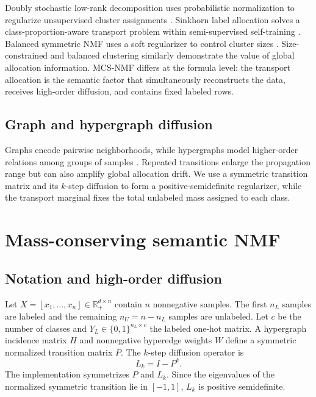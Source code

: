 \documentclass[times, review, 10pt]{elsarticle}
\newcommand{\R}{\mathbb{R}}
\begin{document}
Doubly stochastic low-rank decomposition uses probabilistic normalization to regularize unsupervised cluster assignments \cite{Yang2016Doubly}. Sinkhorn label allocation solves a class-proportion-aware transport problem within semi-supervised self-training \cite{Tai2021Sinkhorn}. Balanced symmetric NMF uses a soft regularizer to control cluster sizes \cite{Wang2026BSNMF}. Size-constrained and balanced clustering similarly demonstrate the value of global allocation information. MCS-NMF differs at the formula level: the transport allocation is the semantic factor that simultaneously reconstructs the data, receives high-order diffusion, and contains fixed labeled rows.

\subsection{Graph and hypergraph diffusion}

Graphs encode pairwise neighborhoods, while hypergraphs model higher-order relations among groups of samples \cite{Qiao2018GraphReview,Gao2022HypergraphReview,Song2023GSSLReview}. Repeated transitions enlarge the propagation range but can also amplify global allocation drift. We use a symmetric transition matrix and its $k$-step diffusion to form a positive-semidefinite regularizer, while the transport marginal fixes the total unlabeled mass assigned to each class.

\section{Mass-conserving semantic NMF}

\subsection{Notation and high-order diffusion}

Let $X=[x_1,\ldots,x_n]\in\R_+^{d\times n}$ contain $n$ nonnegative samples. The first $n_L$ samples are labeled and the remaining $n_U=n-n_L$ samples are unlabeled. Let $c$ be the number of classes and $Y_L\in\{0,1\}^{n_L\times c}$ the labeled one-hot matrix. A hypergraph incidence matrix $H$ and nonnegative hyperedge weights $W$ define a symmetric normalized transition matrix $P$. The $k$-step diffusion operator is
\begin{equation}
L_k=I-P^k.
\label{eq:Lk}
\end{equation}
The implementation symmetrizes $P$ and $L_k$. Since the eigenvalues of the normalized symmetric transition lie in $[-1,1]$, $L_k$ is positive semidefinite.
\end{document}
